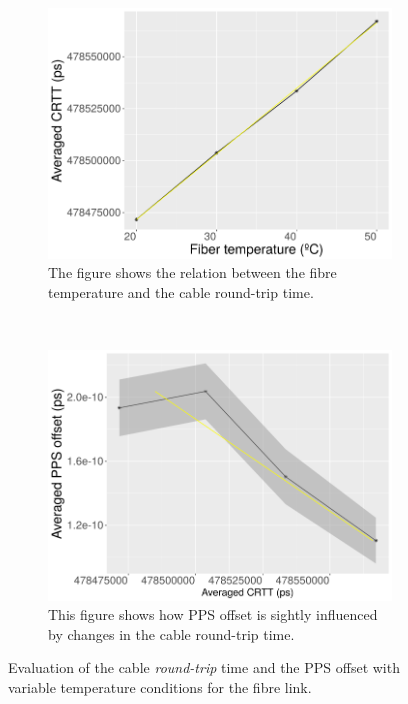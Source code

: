 
\begin{figure}
	\centering
	\begin{subfigure}[t]{0.48\textwidth}
		\includegraphics[width=\textwidth]{img/crttvstemp}
		\caption[CRTT vs. Fiber temperature]{The figure shows the relation 
			between the fibre temperature and the cable round-trip time.}
		\label{fig:crttvstemp}
	\end{subfigure}
	~ %
	\begin{subfigure}[t]{0.48\textwidth}
		\includegraphics[width=\textwidth]{img/ppsvscrtt}
		\caption[PPS offset vs. CRTT]{This figure shows how PPS offset is 
			sightly influenced by changes in the cable round-trip time.}
		\label{fig:ppsvscrtt}
	\end{subfigure}
	\caption{Evaluation of the cable \textit{round-trip} time and the PPS 
		offset with variable temperature conditions for the fibre link.}
\end{figure}

